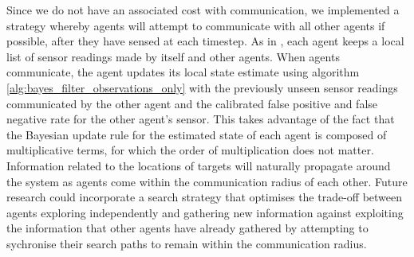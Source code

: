 Since we do not have an associated cost with communication, we implemented a strategy whereby agents will attempt to communicate with all other agents if possible, after they have sensed at each timestep. As in \cite{Waharte2009CoordinatedUAVs}, each agent keeps a local list of sensor readings made by itself and other agents. When agents communicate, the agent updates its local state estimate using algorithm \ref{alg:bayes_filter_observations_only} with the previously unseen sensor readings communicated by the other agent and the calibrated false positive and false negative rate for the other agent's sensor. This takes advantage of the fact that the Bayesian update rule for the estimated state of each agent is composed of multiplicative terms, for which the order of multiplication does not matter. Information related to the locations of targets will naturally propagate around the system as agents come within the communication radius of each other. Future research could incorporate a search strategy that optimises the trade-off between agents exploring independently and gathering new information against exploiting the information that other agents have already gathered by attempting to sychronise their search paths to remain within the communication radius.